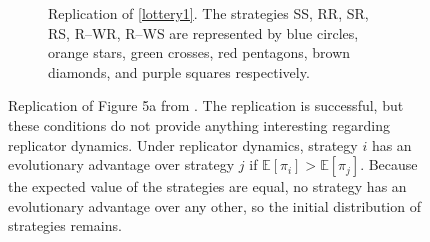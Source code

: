 \begin{figure}[!h]
\begin{subfigure}[b]{0.45\textwidth}
    \caption{Replication of \ref{lottery1}. The strategies SS, RR, SR, RS, R--WR, R--WS are represented by blue circles, orange stars, green crosses, red pentagons, brown diamonds, and purple squares respectively.}
    \label{lottery1_me}
  \end{subfigure}
  \caption{Replication of Figure 5a from \cite{RN30}. The replication is successful, but these conditions do not provide anything interesting regarding replicator dynamics. Under replicator dynamics, strategy $i$ has an evolutionary advantage over strategy $j$ if $\mathbb E [\pi_i] >\mathbb E [\pi_j]$. Because the expected value of the strategies are equal, no strategy has an evolutionary advantage over any other, so the initial distribution of strategies remains. } \label{lottery_comp0}
\end{figure} 
\FloatBarrier

